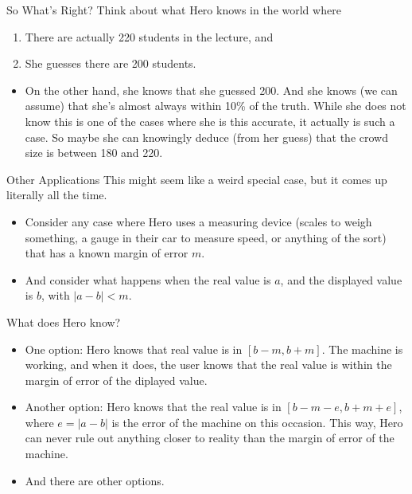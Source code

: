 \documentclass[
  14pt,
  letterpaper,
  ignorenonframetext,
  handout]{beamer}
\providecommand{\tightlist}{%
  \setlength{\itemsep}{0pt}\setlength{\parskip}{0pt}}\usepackage{longtable,booktabs,array}
\begin{document}
\begin{frame}{So What's Right?}
\protect\hypertarget{so-whats-right-1}{}
Think about what Hero knows in the world where

\begin{enumerate}
\tightlist
\item
  There are actually 220 students in the lecture, and
\item
  She guesses there are 200 students. \pause 
\end{enumerate}

\begin{itemize}
\tightlist
\item
  On the other hand, she knows that she guessed 200. And she knows (we
  can assume) that she's almost always within 10\% of the truth. While
  she does not know this is one of the cases where she is this accurate,
  it actually is such a case. So maybe she can knowingly deduce (from
  her guess) that the crowd size is between 180 and 220.
\end{itemize}
\end{frame}

\begin{frame}{Other Applications}
\protect\hypertarget{other-applications}{}
This might seem like a weird special case, but it comes up literally all
the time.

\begin{itemize}
\tightlist
\item
  Consider any case where Hero uses a measuring device (scales to weigh
  something, a gauge in their car to measure speed, or anything of the
  sort) that has a known margin of error \(m\).
\item
  And consider what happens when the real value is \(a\), and the
  displayed value is \(b\), with \(|a - b| < m\).
\end{itemize}
\end{frame}

\begin{frame}{What does Hero know?}
\protect\hypertarget{what-does-hero-know}{}
\begin{itemize}
\tightlist
\item
  One option: Hero knows that real value is in \([b-m, b+m]\). The
  machine is working, and when it does, the user knows that the real
  value is within the margin of error of the diplayed value.
\item
  Another option: Hero knows that the real value is in
  \([b-m-e, b+m+e]\), where \(e = |a - b|\) is the error of the machine
  on this occasion. This way, Hero can never rule out anything closer to
  reality than the margin of error of the machine.
\item
  And there are other options.
\end{itemize}
\end{frame}
\end{document}
